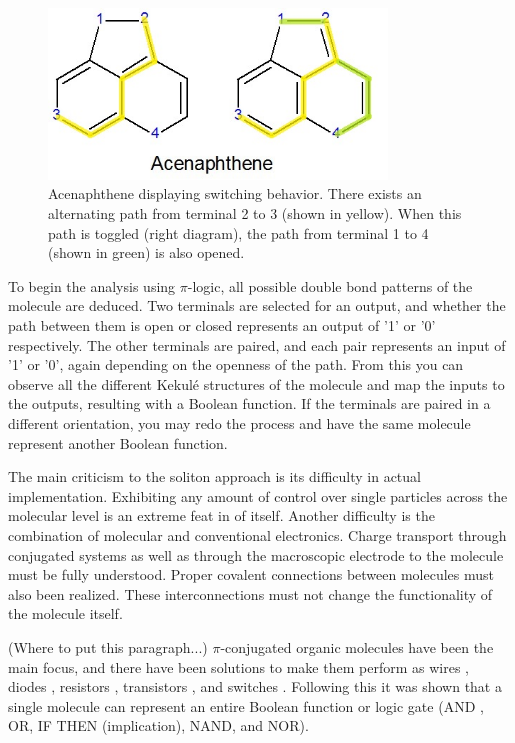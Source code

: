 \documentclass[12pt]{article}
\begin{document}
\begin{figure}[ht!]
\centering
\includegraphics[width=90mm]{AcenaphtheneHighlighted.jpg}
\caption{Acenaphthene displaying switching behavior. There exists an alternating path from terminal 2 to 3 (shown in yellow). When this path is toggled (right diagram), the path from terminal 1 to 4 (shown in green) is also opened.}
\label{fig:acenaptheneHighlighted}
\end{figure}

To begin the analysis using $\pi$-logic, all possible double bond patterns of the molecule are deduced. Two terminals are selected for an output, and whether the path between them is open or closed represents an output of '1' or '0' respectively. The other terminals are paired, and each pair represents an input of '1' or '0', again depending on the openness of the path. From this you can observe all the different Kekul\'e structures of the molecule and map the inputs to the outputs, resulting with a Boolean function. If the terminals are paired in a different orientation, you may redo the process and have the same molecule represent another Boolean function. 

The main criticism to the soliton approach is its difficulty in actual implementation. Exhibiting any amount of control over single particles across the molecular level is an extreme feat in of itself. Another difficulty is the combination of molecular and conventional electronics. Charge transport through conjugated systems as well as through the macroscopic electrode to the molecule must be fully understood. Proper covalent connections between molecules must also been realized. These interconnections must not change the functionality of the molecule itself. 

(Where to put this paragraph...) $\pi$-conjugated organic molecules have been the main focus, and there have been solutions to make them perform as wires \cite{9}, diodes \cite{10,11}, resistors \cite{12,13}, transistors \cite{14, 15, 16, 17}, and switches \cite{18, 19}. Following this it was shown that a single molecule can represent an entire Boolean function or logic gate (AND\cite{20} , OR\cite{21}, IF THEN (implication)\cite{22}, NAND\cite{23}, and NOR\cite{24}). 
\end{document}
